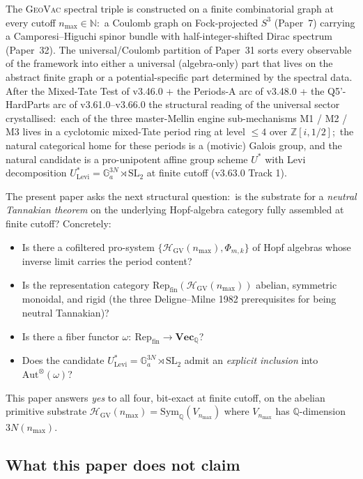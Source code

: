 \documentclass[11pt,a4paper]{article}
\theoremstyle{plain}
\theoremstyle{definition}
\newcommand{\nmax}{n_{\max}}
\newcommand{\HGV}{\mathcal{H}_{\mathrm{GV}}}
\newcommand{\Repcat}{\mathrm{Rep}_{\mathrm{fin}}}
\newcommand{\Aut}{\mathrm{Aut}}
\newcommand{\Sym}{\mathrm{Sym}}
\newcommand{\SL}{\mathrm{SL}}
\newcommand{\Ga}{\mathbb{G}_{a}}
\newcommand{\Vecbf}{\mathbf{Vec}}
\newcommand{\Q}{\mathbb{Q}}
\newcommand{\Z}{\mathbb{Z}}
\newcommand{\N}{\mathbb{N}}
\newcommand{\Ulev}{U^{*}_{\mathrm{Levi}}}
\newcommand{\Ustar}{U^{*}}
\newcommand{\fibfun}{\omega}
\begin{document}
The \textsc{GeoVac} spectral triple is constructed on a finite
combinatorial graph at every cutoff $\nmax \in \N$:\ a Coulomb graph on
Fock-projected $S^{3}$ (Paper~7) carrying a Camporesi--Higuchi spinor
bundle with half-integer-shifted Dirac spectrum (Paper~32). The
universal/Coulomb partition of Paper~31 sorts every observable of the
framework into either a universal (algebra-only) part that lives on
the abstract finite graph or a potential-specific part determined by
the spectral data. After the Mixed-Tate Test of v3.46.0 + the
Periods-A arc of v3.48.0 + the Q5'-HardParts arc of v3.61.0--v3.66.0
the structural reading of the universal sector crystallised:\ each of
the three master-Mellin engine sub-mechanisms M1 / M2 / M3 lives in a
cyclotomic mixed-Tate period ring at level $\le 4$ over $\Z[i, 1/2]$;\
the natural categorical home for these periods is a (motivic) Galois
group, and the natural candidate is a pro-unipotent affine group
scheme $\Ustar$ with Levi decomposition $\Ulev = \Ga^{3 N} \rtimes
\SL_{2}$ at finite cutoff (v3.63.0 Track 1).

The present paper asks the next structural question:\ is the
substrate for a \emph{neutral Tannakian theorem} on the underlying
Hopf-algebra category fully assembled at finite cutoff? Concretely:

\begin{itemize}
\item Is there a cofiltered pro-system $\{\HGV(\nmax), \Phi_{m,k}\}$
  of Hopf algebras whose inverse limit carries the period content?
\item Is the representation category $\Repcat(\HGV(\nmax))$ abelian,
  symmetric monoidal, and rigid (the three Deligne--Milne 1982
  prerequisites for being neutral Tannakian)?
\item Is there a fiber functor $\fibfun :\ \Repcat \to \Vecbf_{\Q}$?
\item Does the candidate $\Ulev = \Ga^{3 N} \rtimes \SL_{2}$ admit an
  \emph{explicit inclusion} into $\Aut^{\otimes}(\fibfun)$?
\end{itemize}

This paper answers \emph{yes} to all four, bit-exact at finite cutoff,
on the abelian primitive substrate $\HGV(\nmax) = \Sym_{\Q}(V_{\nmax})$
where $V_{\nmax}$ has $\Q$-dimension $3 N(\nmax)$.

\subsection{What this paper does not claim}\label{sec:scope}
\end{document}
